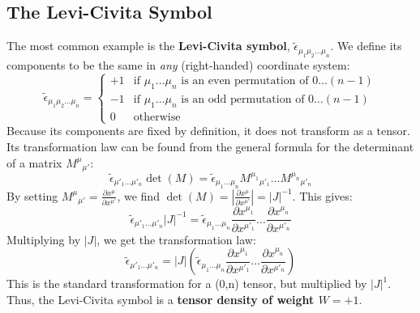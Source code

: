 \documentclass[11pt, a4paper]{report}
\begin{document}
\subsection*{The Levi-Civita Symbol}
The most common example is the \textbf{Levi-Civita symbol}, $\tilde{\epsilon}_{\mu_1\mu_2\dots\mu_n}$. We define its components to be the same in \emph{any} (right-handed) coordinate system:
\begin{equation}
    \tilde{\epsilon}_{\mu_1\mu_2\dots\mu_n} =
    \begin{cases}
        +1 & \text{if } \mu_1\dots\mu_n \text{ is an even permutation of } 0\dots(n-1) \\
        -1 & \text{if } \mu_1\dots\mu_n \text{ is an odd permutation of } 0\dots(n-1) \\
        0 & \text{otherwise}
    \end{cases}
\end{equation}
Because its components are fixed by definition, it does not transform as a tensor.
Its transformation law can be found from the general formula for the determinant of a matrix $M^{\mu}{}_{\mu'}$:
\[
    \tilde{\epsilon}_{\mu'_1 \dots \mu'_n} \det(M) = \tilde{\epsilon}_{\mu_1 \dots \mu_n} M^{\mu_1}{}_{\mu'_1} \dots M^{\mu_n}{}_{\mu'_n}
\]
By setting $M^{\mu}{}_{\mu'} = \frac{\partial x^\mu}{\partial x^{\mu'}}$, we find $\det(M) = \left|\frac{\partial x^\mu}{\partial x^{\mu'}}\right| = |J|^{-1}$.
This gives:
\[
    \tilde{\epsilon}_{\mu'_1 \dots \mu'_n} |J|^{-1} = \tilde{\epsilon}_{\mu_1 \dots \mu_n} \frac{\partial x^{\mu_1}}{\partial x^{\mu'_1}} \dots \frac{\partial x^{\mu_n}}{\partial x^{\mu'_n}}
\]
Multiplying by $|J|$, we get the transformation law:
\begin{equation}
    \tilde{\epsilon}_{\mu'_1 \dots \mu'_n} = |J| \left( \tilde{\epsilon}_{\mu_1 \dots \mu_n} \frac{\partial x^{\mu_1}}{\partial x^{\mu'_1}} \dots \frac{\partial x^{\mu_n}}{\partial x^{\mu'_n}} \right)
\end{equation}
This is the standard transformation for a (0,n) tensor, but multiplied by $|J|^1$. Thus, the Levi-Civita symbol is a \textbf{tensor density of weight $W=+1$}.
\end{document}
